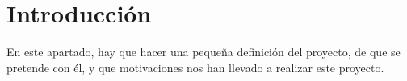

\section{Introducción}

En este apartado, hay que hacer una pequeña definición del proyecto,
de que se pretende con él, y que motivaciones nos han llevado a
realizar este proyecto.\\
